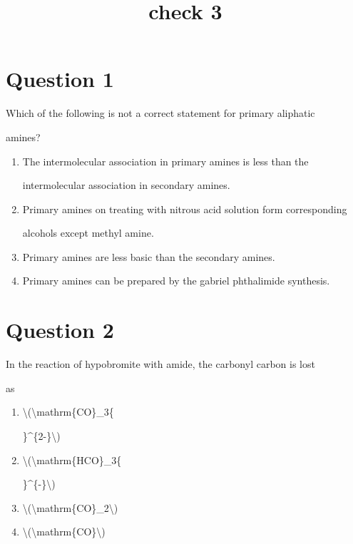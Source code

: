 \documentclass{article}
\title{check 3}
\begin{document}
    \maketitle
    \section*{Question 1}
Which of the following is not a correct statement for primary aliphatic

amines?


\begin{enumerate}[label=(\alph*)]
\item The intermolecular association in primary amines is less than the

intermolecular association in secondary amines.


\item Primary amines on treating with nitrous acid solution form corresponding

alcohols except methyl amine.


\item Primary amines are less basic than the secondary amines.


\item Primary amines can be prepared by the gabriel phthalimide synthesis.


\end{enumerate}
\newpage
\section*{Question 2}
In the reaction of hypobromite with amide, the carbonyl carbon is lost

as


\begin{enumerate}[label=(\alph*)]
\item \textbackslash(\textbackslash mathrm\{CO\}\_3\{

\}\^{}\{2-\}\textbackslash)


\item \textbackslash(\textbackslash mathrm\{HCO\}\_3\{

\}\^{}\{-\}\textbackslash)


\item \textbackslash(\textbackslash mathrm\{CO\}\_2\textbackslash)


\item \textbackslash(\textbackslash mathrm\{CO\}\textbackslash)


\end{enumerate}
\newpage
\end{document}
